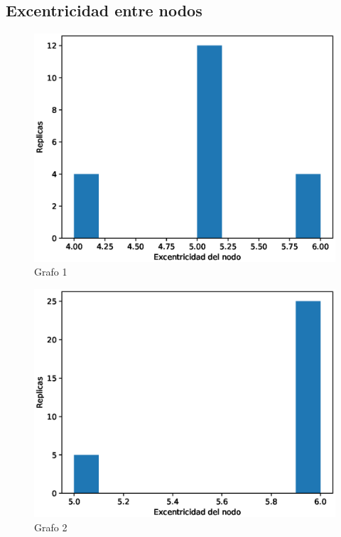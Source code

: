 \documentclass{article}
\begin{document}
\subsection{Excentricidad entre nodos}
\begin{figure}[H]
    \includegraphics[scale=0.6]{hist-centralidad-1}
    \caption{Grafo 1}
    \label{fig:matriz}
\end{figure}
\begin{figure}[H]
    \includegraphics[scale=0.6]{hist-centralidad-2}
    \caption{Grafo 2}
    \label{fig:matriz}
\end{figure}
\end{document}
